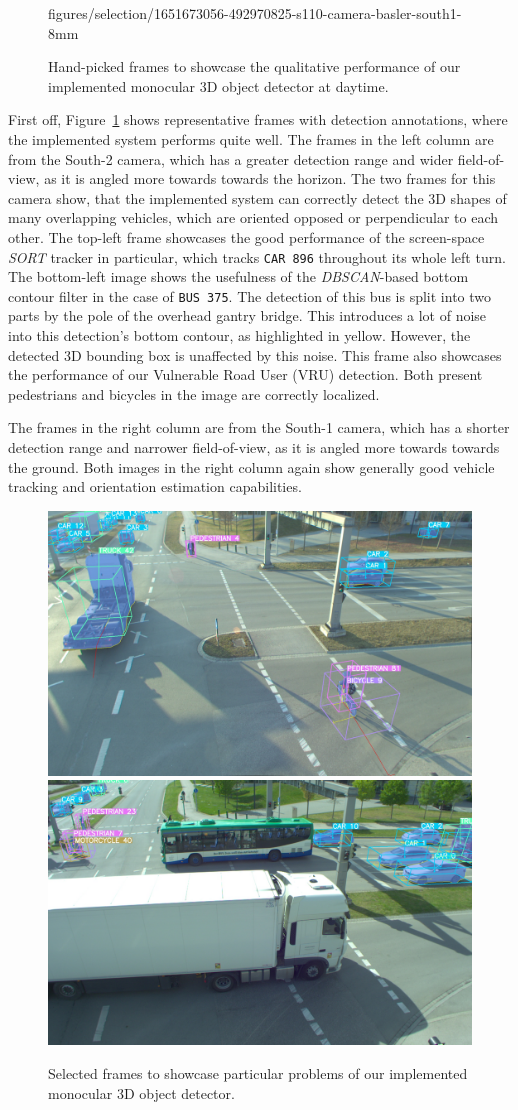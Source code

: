\begin{figure}[htb]
{        figures/selection/1651673056-492970825-s110-camera-basler-south1-8mm}
    \caption{Hand-picked frames to showcase the qualitative performance of our implemented monocular 3D object detector at daytime.}
    \label{fig:qualitative-results-day}
\end{figure}

First off, Figure~\ref{fig:qualitative-results-day} shows representative frames with detection annotations, where the implemented system performs quite well.
The frames in the left column are from the South-2 camera, which has a greater detection range and wider field-of-view, as it is angled more towards towards the horizon.
The two frames for this camera show, that the implemented system can correctly detect the 3D shapes of many overlapping vehicles, which are oriented opposed or perpendicular to each other.
The top-left frame showcases the good performance of the screen-space \textit{SORT} tracker in particular, which tracks \texttt{CAR 896} throughout its whole left turn.
The bottom-left image shows the usefulness of the \textit{DBSCAN}-based bottom contour filter in the case of \texttt{BUS 375}.
The detection of this bus is split into two parts by the pole of the overhead gantry bridge.
This introduces a lot of noise into this detection's bottom contour, as highlighted in yellow.
However, the detected 3D bounding box is unaffected by this noise.
This frame also showcases the performance of our Vulnerable Road User (VRU) detection.
Both present pedestrians and bicycles in the image are correctly localized.

The frames in the right column are from the South-1 camera, which has a shorter detection range and narrower field-of-view, as it is angled more towards towards the ground.
Both images in the right column again show generally good vehicle tracking and orientation estimation capabilities.

\begin{figure}[htb]
    \includegraphics[width=0.499\linewidth]{
        figures/selection/1646667395-641065639-s110-camera-basler-south1-8mm}
    \includegraphics[width=0.499\linewidth]{
        figures/selection/1651673050-162472285-s110-camera-basler-south1-8mm}
    \caption{Selected frames to showcase particular problems of our implemented monocular 3D object detector.}
    \label{fig:qualitative-results-bad}
\end{figure}

